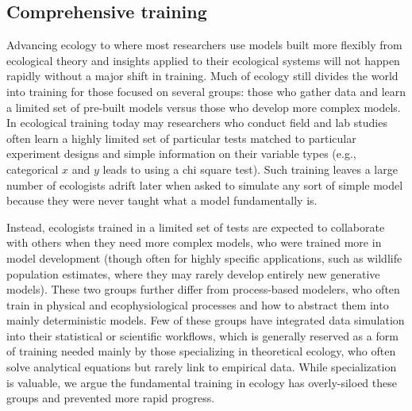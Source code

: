 \documentclass[11pt]{article}
\begin{document}
\subsection{Comprehensive training}
Advancing ecology to where most researchers use models built more flexibly from ecological theory and insights applied to their ecological systems will not happen rapidly without a major shift in training. Much of ecology still divides the world into training for those focused on several groups: those who gather data and learn a limited set of pre-built models versus those who develop more complex models. In ecological training today may researchers who conduct field and lab studies often learn a highly limited set of particular tests matched to particular experiment designs and simple information on their variable types (e.g., categorical $x$ and $y$ leads to using a chi square test). Such training leaves a large number of ecologists adrift later when asked to simulate any sort of simple model because they were never taught what a model fundamentally is. 

Instead, ecologists trained in a limited set of tests are expected to collaborate with others when they need more complex models, who were trained more in model development (though often for highly specific applications, such as wildlife population estimates, where they may rarely develop entirely new generative models). These two groups further differ from process-based modelers, who often train in physical and ecophysiological processes and how to abstract them into mainly deterministic models. %
Few of these groups have integrated data simulation into their statistical or scientific workflows, which is generally reserved as a form of training needed mainly by those specializing in theoretical ecology, who often solve analytical equations but rarely link to empirical data. While specialization is valuable, we argue the fundamental training in ecology has overly-siloed these groups and prevented more rapid progress.
\end{document}
